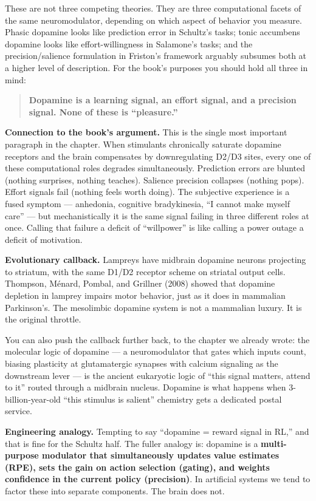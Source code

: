 These are not three competing theories. They are three computational facets of the same neuromodulator, depending on which aspect of behavior you measure. Phasic dopamine looks like prediction error in Schultz's tasks; tonic accumbens dopamine looks like effort-willingness in Salamone's tasks; and the precision/salience formulation in Friston's framework arguably subsumes both at a higher level of description. For the book's purposes you should hold all three in mind:

\begin{quote}
\textbf{Dopamine is a learning signal, an effort signal, and a precision signal. None of these is ``pleasure.''}
\end{quote}

\textbf{Connection to the book's argument.} This is the single most important paragraph in the chapter. When stimulants chronically saturate dopamine receptors and the brain compensates by downregulating D2/D3 sites, every one of these computational roles degrades simultaneously. Prediction errors are blunted (nothing surprises, nothing teaches). Salience precision collapses (nothing pops). Effort signals fail (nothing feels worth doing). The subjective experience is a fused symptom --- anhedonia, cognitive bradykinesia, ``I cannot make myself care'' --- but mechanistically it is the same signal failing in three different roles at once. Calling that failure a deficit of ``willpower'' is like calling a power outage a deficit of motivation.

\textbf{Evolutionary callback.} Lampreys have midbrain dopamine neurons projecting to striatum, with the same D1/D2 receptor scheme on striatal output cells. Thompson, Ménard, Pombal, and Grillner (2008) showed that dopamine depletion in lamprey impairs motor behavior, just as it does in mammalian Parkinson's. The mesolimbic dopamine system is not a mammalian luxury. It is the original throttle.

You can also push the callback further back, to the chapter we already wrote: the molecular logic of dopamine --- a neuromodulator that gates which inputs count, biasing plasticity at glutamatergic synapses with calcium signaling as the downstream lever --- is the ancient eukaryotic logic of ``this signal matters, attend to it'' routed through a midbrain nucleus. Dopamine is what happens when 3-billion-year-old ``this stimulus is salient'' chemistry gets a dedicated postal service.

\textbf{Engineering analogy.} Tempting to say ``dopamine = reward signal in RL,'' and that is fine for the Schultz half. The fuller analogy is: dopamine is a \textbf{multi-purpose modulator that simultaneously updates value estimates (RPE), sets the gain on action selection (gating), and weights confidence in the current policy (precision)}. In artificial systems we tend to factor these into separate components. The brain does not.

